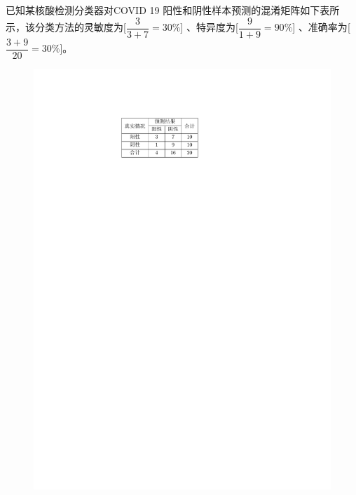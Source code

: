 \begin{example}
    已知某核酸检测分类器对COVID 19 阳性和阴性样本预测的混淆矩阵如下表所示，该分类方法的灵敏度为\textcolor{main1}{[$\dfrac{3}{3+7} = 30\%$]} 、特异度为\textcolor{main1}{[$\dfrac{9}{1+9} = 90\%$]} 、准确率为\textcolor{main1}{[$\dfrac{3+9}{20} = 30\%$]}。
    \begin{figure}[htbp]
        \centering
        \includegraphics{image/混淆矩阵例题.pdf}
    \end{figure}
\end{example}

